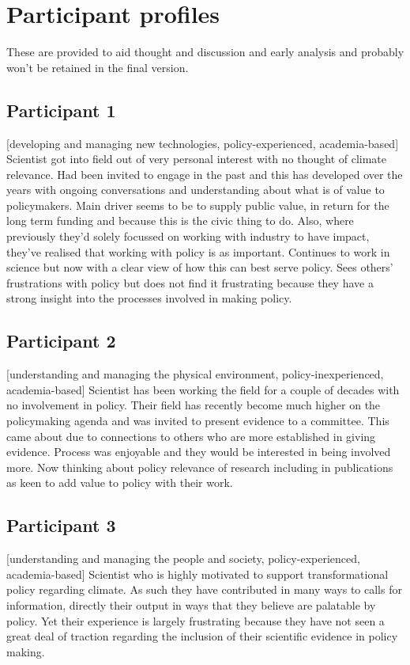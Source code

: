 \section{Participant profiles}\label{sec:profiles}
These are provided to aid thought and discussion and early analysis and probably won't be retained in the final version.

\subsection{Participant 1}\label{sec:p1}
[developing and managing new technologies, policy-experienced, academia-based] Scientist got into field out of very personal interest with no thought of climate relevance. Had been invited to engage in the past and this has developed over the years with ongoing conversations and understanding about what is of value to policymakers. Main driver seems to be to supply public value, in return for the long term funding and because this is the civic thing to do. Also, where previously they'd solely focussed on working with industry to have impact, they've realised that working with policy is as important. Continues to work in science but now with a clear view of how this can best serve policy. Sees others' frustrations with policy but does not find it frustrating because they have a strong insight into the processes involved in making policy.

\subsection{Participant 2}\label{sec:p2}
[understanding and managing the physical environment, policy-inexperienced, academia-based] Scientist has been working the field for a couple of decades with no involvement in policy. Their field has recently become much higher on the policymaking agenda and was invited to present evidence to a committee. This came about due to connections to others who are more established in giving evidence. Process was enjoyable and they would be interested in being involved more. Now thinking about policy relevance of research including in publications as keen to add value to policy with their work.

\subsection{Participant 3}\label{sec:p3}
[understanding and managing the people and society, policy-experienced, academia-based] Scientist who is highly motivated to support transformational policy regarding climate. As such they have contributed in many ways to calls for information, directly their output in ways that they believe are palatable by policy. Yet their experience is largely frustrating because they have not seen a great deal of traction regarding the inclusion of their scientific evidence in policy making.

